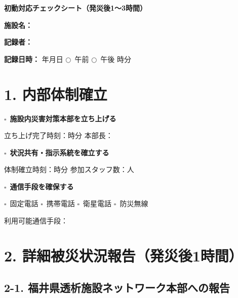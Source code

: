 \documentclass[a4paper,12pt]{jarticle}
\newcommand{\checkbox}{$\square$\ }
\newcommand{\underlinespace}[1]{\underline{\hspace{#1}}}
\newcommand{\circlecheck}{$\bigcirc$\ }
\begin{document}
\begin{center}
{\Large\textbf{初動対応チェックシート（発災後1～3時間）}}
\end{center}
\vspace{5mm}

\noindent
\textbf{施設名：} \underlinespace{8cm}

\vspace{3mm}

\noindent
\textbf{記録者：} \underlinespace{4cm}

\vspace{3mm}

\noindent
\textbf{記録日時：} \underlinespace{2cm}年\underlinespace{1cm}月\underlinespace{1cm}日 \quad \circlecheck 午前 \quad \circlecheck 午後 \quad \underlinespace{1cm}時\underlinespace{1cm}分

\vspace{5mm}

\section*{1. 内部体制確立}

\checkbox \textbf{施設内災害対策本部を立ち上げる}

\quad 立ち上げ完了時刻：\underlinespace{1cm}時\underlinespace{1cm}分 \quad 本部長：\underlinespace{4cm}

\vspace{3mm}

\checkbox \textbf{状況共有・指示系統を確立する}

\quad 体制確立時刻：\underlinespace{1cm}時\underlinespace{1cm}分 \quad 参加スタッフ数：\underlinespace{2cm}人

\vspace{3mm}

\checkbox \textbf{通信手段を確保する}

\quad \checkbox 固定電話 \quad \checkbox 携帯電話 \quad \checkbox 衛星電話 \quad \checkbox 防災無線

\quad 利用可能通信手段：\underlinespace{10cm}

\vspace{5mm}

\section*{2. 詳細被災状況報告（発災後1時間）}

\subsection*{2-1. 福井県透析施設ネットワーク本部への報告}
\end{document}
